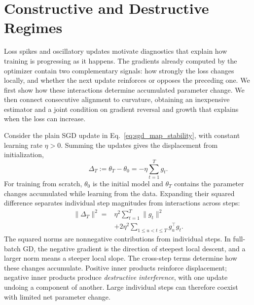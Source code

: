 \section{Constructive and Destructive Regimes}
\label{sec:displacement}

Loss spikes and oscillatory updates motivate diagnostics that explain how
training is progressing as it happens. The gradients already computed by
the optimizer contain two complementary signals: how strongly the loss
changes locally, and whether the next update reinforces or opposes the
preceding one. We first show how these interactions determine accumulated
parameter change. We then connect consecutive alignment to curvature,
obtaining an inexpensive estimator and a joint condition on gradient
reversal and growth that explains when the loss can increase.

Consider the plain SGD update in Eq.~\eqref{eq:sgd_map_stability}, with
constant learning rate $\eta>0$. Summing the updates gives the displacement
from initialization,
\begin{equation}
  \Delta_T:=\theta_T-\theta_0=-\eta\sum_{t=1}^T g_t.
  \label{eq:displacement}
\end{equation}
For training from scratch, $\theta_0$ is the initial model and $\theta_T$
contains the parameter changes accumulated while learning from the data.
Expanding their squared difference separates individual step magnitudes
from interactions across steps:
\begin{equation}
\begin{aligned}
  \|\Delta_T\|^2
  ={}&\eta^2\sum_{t=1}^T\|g_t\|^2\\
     &+2\eta^2\sum_{1\leq u<t\leq T}g_u^\top g_t.
\end{aligned}
\label{eq:magnitude-interaction}
\end{equation}
The squared norms are nonnegative contributions from individual steps.
In full-batch GD, the negative gradient is the direction of steepest
local descent, and a larger norm means a steeper local slope. The
cross-step terms determine how these changes accumulate. Positive inner
products reinforce displacement; negative inner products produce
\emph{destructive interference}, with one update undoing a component
of another. Large individual steps can therefore coexist with limited
net parameter change.

